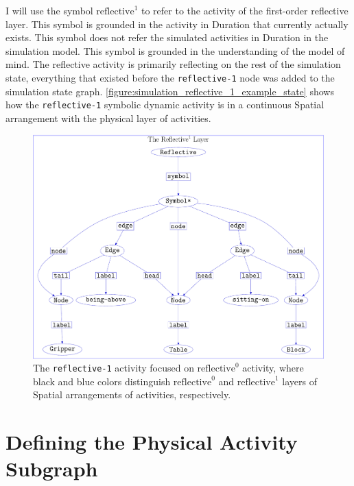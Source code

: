 I will use the symbol {\tt $\text{reflective}^1$} to refer to the
activity of the first-order reflective layer.  This symbol is grounded
in the activity in Duration that currently actually exists.  This
symbol does not refer the simulated activities in Duration in the
simulation model.  This symbol is grounded in the understanding of the
model of mind.  The reflective activity is primarily reflecting on the
rest of the simulation state, everything that existed before the
{\tt{reflective-1}} node was added to the simulation state graph.
{\mbox{\autoref{figure:simulation_reflective_1_example_state}}} shows
how the {\tt reflective-1} symbolic dynamic activity is in a
continuous Spatial arrangement with the physical layer of activities.
\begin{figure}
\includegraphics[width=12cm]{gfx/simulation_reflective_1_example_state}
\caption[The {\tt reflective-1} activity focused on physical
  activity.]{The {\tt reflective-1} activity focused on
  $\text{reflective}^0$ activity, where black and blue colors
  distinguish $\text{reflective}^0$ and $\text{reflective}^1$ layers
  of Spatial arrangements of activities, respectively.}
\label{figure:simulation_reflective_1_example_state}
\end{figure}

\section{Defining the Physical Activity Subgraph}

